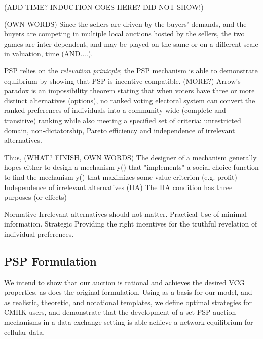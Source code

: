 \documentclass[12pt]{article}
\theoremstyle{definition}
\begin{document}
\begin{multicols}{2}
(ADD TIME? INDUCTION GOES HERE? DID NOT SHOW!)

(OWN
WORDS) Since the sellers are driven by the buyers' demands, and the buyers are
competing in multiple local auctions hosted by the sellers, the two games are
inter-dependent, and may be played on the same or on a different scale in
valuation, time (AND....). 


PSP relies on the \emph{relevation prinicple}; the
PSP mechanism is able to demonstrate equlibrium by showing that PSP is
incentive-compatible. (MORE?)
Arrow's paradox is an impossibility theorem stating that when voters have three
or more distinct alternatives (options), no ranked voting electoral system can
convert the ranked preferences of individuals into a community-wide (complete
and transitive) ranking while also meeting a specified set of criteria:
unrestricted domain, non-dictatorship, Pareto efficiency and independence of
irrelevant alternatives.

Thus, (WHAT? FINISH, OWN WORDS)
The designer of a mechanism generally hopes either to design a mechanism
y() that "implements" a social choice function to find the
mechanism y() that maximizes some value criterion (e.g. profit)
Independence of irrelevant alternatives (IIA)
The IIA condition has three purposes (or effects)

Normative
Irrelevant alternatives should not matter.
Practical
Use of minimal information.
Strategic
Providing the right incentives for the truthful revelation of individual
preferences. 

\subsection{PSP Formulation}

We intend to show that our auction
is rational and achieves the desired VCG properties, as does the original
formulation. Using \cite{zheng} as a basis for our model, and \cite{lazar} as
realistic, theoretic, and notational templates, we define optimal strategies for
CMHK users, and demonstrate that the development of a set PSP auction mechanisms
in a data exchange setting is able achieve a network equilibrium for cellular data. 



\end{multicols}
\end{document}
